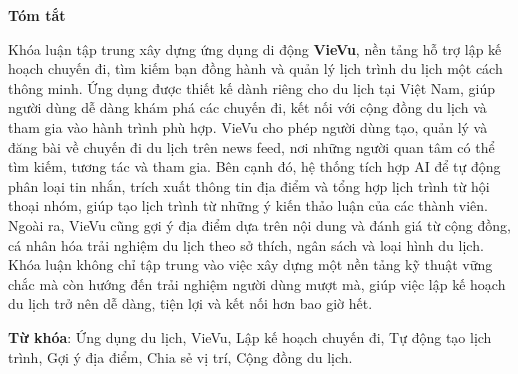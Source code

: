 \begin{center}
\textbf{\large{Tóm tắt}}
\end{center}
Khóa luận tập trung xây dựng ứng dụng di động \textbf{VieVu}, nền tảng hỗ trợ lập kế hoạch chuyến đi, tìm kiếm bạn đồng hành và quản lý lịch trình du lịch một cách thông minh. Ứng dụng được thiết kế dành riêng cho du lịch tại Việt Nam, giúp người dùng dễ dàng khám phá các chuyến đi, kết nối với cộng đồng du lịch và tham gia vào hành trình phù hợp.  
VieVu cho phép người dùng tạo, quản lý và đăng bài về chuyến đi du lịch trên news feed, nơi những người quan tâm có thể tìm kiếm, tương tác và tham gia. Bên cạnh đó, hệ thống tích hợp AI để tự động phân loại tin nhắn, trích xuất thông tin địa điểm và tổng hợp lịch trình từ hội thoại nhóm, giúp tạo lịch trình từ những ý kiến thảo luận của các thành viên.  
Ngoài ra, VieVu cũng gợi ý địa điểm dựa trên nội dung và đánh giá từ cộng đồng, cá nhân hóa trải nghiệm du lịch theo sở thích, ngân sách và loại hình du lịch.  
Khóa luận không chỉ tập trung vào việc xây dựng một nền tảng kỹ thuật vững chắc mà còn hướng đến trải nghiệm người dùng mượt mà, giúp việc lập kế hoạch du lịch trở nên dễ dàng, tiện lợi và kết nối hơn bao giờ hết.  
    
\vspace{0.5cm}
\noindent \textbf{Từ khóa}: Ứng dụng du lịch, VieVu, Lập kế hoạch chuyến đi, Tự động tạo lịch trình, Gợi ý địa điểm, Chia sẻ vị trí, Cộng đồng du lịch.
    